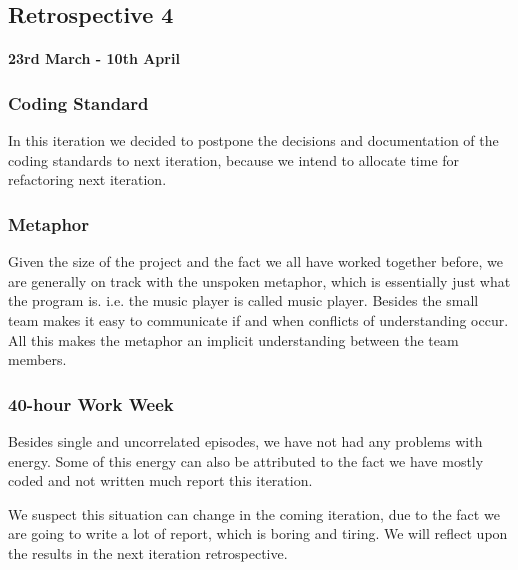 \subsection*{Retrospective 4}
\paragraph{23rd March - 10th April}

\subsubsection{Coding Standard}
In this iteration we decided to postpone the decisions and documentation of the coding standards to next iteration, because we intend to allocate time for refactoring next iteration. 
\subsubsection{Metaphor}
Given the size of the project and the fact we all have worked together before, we are generally on track with the unspoken metaphor, which is essentially just what the program is. i.e. the music player is called music player.
Besides the small team makes it easy to communicate if and when conflicts of understanding occur.
All this makes the metaphor an implicit understanding between the team members.

\subsubsection{40-hour Work Week}
Besides single and uncorrelated episodes, we have not had any problems with energy.
Some of this energy can also be attributed to the fact we have mostly coded and not written much report this iteration. 

We suspect this situation can change in the coming iteration, due to the fact we are going to write a lot of report, which is boring and tiring. We will reflect upon the results in the next iteration retrospective.


